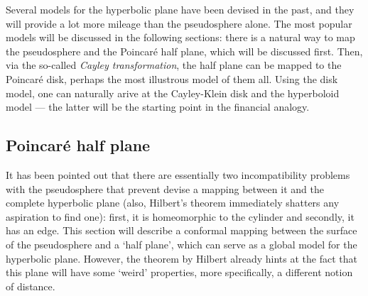 Several models for the hyperbolic plane have been devised in the past, and they will provide a lot more mileage than the pseudosphere alone. The most popular models will be discussed in the following sections: there is a natural way to map the pseudosphere and the Poincaré half plane, which will be discussed first. Then, via the so-called \emph{Cayley transformation}, the half plane can be mapped to the Poincaré disk, perhaps the most illustrous model of them all. Using the disk model, one can naturally arive at the Cayley-Klein disk and the hyperboloid model --- the latter will be the starting point in the financial analogy.

\subsection{Poincaré half plane}
\label{ssec:poincare_halfplane}
It has been pointed out that there are essentially two incompatibility problems with the pseudosphere that prevent devise a mapping between it and the complete hyperbolic plane (also, Hilbert's theorem immediately shatters any aspiration to find one): first, it is homeomorphic to the cylinder and secondly, it has an edge. This section will describe a conformal mapping between the surface of the pseudosphere and a `half plane', which can serve as a global model for the hyperbolic plane. However, the theorem by Hilbert already hints at the fact that this plane will have some `weird' properties, more specifically, a different notion of distance. 

